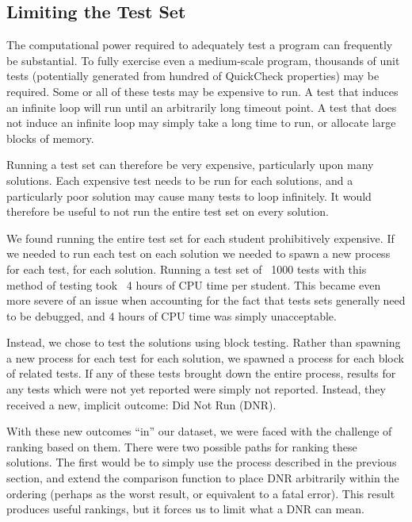 \documentclass[11pt]{article}
\begin{document}
\subsection{Limiting the Test Set}

The computational power required to adequately test a program can frequently be substantial. To fully exercise even a medium-scale program, thousands of unit tests (potentially generated from hundred of QuickCheck properties) may be required. Some or all of these tests may be expensive to run. A test that induces an infinite loop will run until an arbitrarily long timeout point. A test that does not induce an infinite loop may simply take a long time to run, or allocate large blocks of memory.

Running a test set can therefore be very expensive, particularly upon many solutions. Each expensive test needs to be run for each solutions, and a particularly poor solution may cause many tests to loop infinitely. It would therefore be useful to not run the entire test set on every solution. 

We found running the entire test set for each student prohibitively expensive. If we needed to run each test on each solution we needed to spawn a new process for each test, for each solution. Running a test set of ~1000 tests with this method of testing took ~4 hours of CPU time per student. This became even more severe of an issue when accounting for the fact that tests sets generally need to be debugged, and 4 hours of CPU time was simply unacceptable.

Instead, we chose to test the solutions using block testing. Rather than spawning a new process for each test for each solution, we spawned a process for each block of related tests. If any of these tests brought down the entire process, results for any tests which were not yet reported were simply not reported. Instead, they received a new, implicit outcome: Did Not Run (DNR).

With these new outcomes ``in'' our dataset, we were faced with the challenge of ranking based on them. There were two possible paths for ranking these solutions. The first would be to simply use the process described in the previous section, and extend the comparison function to place DNR arbitrarily within the ordering (perhaps as the worst result, or equivalent to a fatal error). This result produces useful rankings, but it forces us to limit what a DNR can mean.
\end{document}
